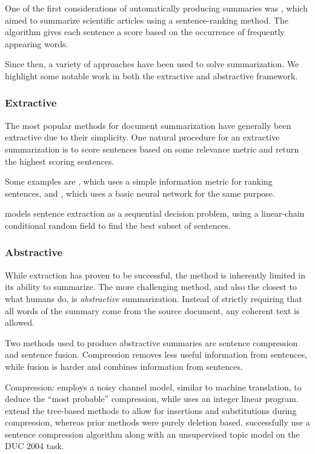 \documentclass[11pt]{report}
\begin{document}
One of the first considerations of automatically producing summaries was \cite{luhn1958automatic}, which aimed to summarize scientific articles using a sentence-ranking method. The algorithm gives each sentence a score based on the occurrence of frequently appearing words.


Since then, a variety of approaches have been used to solve summarization. We highlight some notable work in both the extractive and abstractive framework.

\subsubsection{Extractive}

The most popular methods for document summarization have generally been extractive due to their simplicity. One natural procedure for an extractive summarization is to score sentences based on some relevance metric and return the highest scoring sentences.

Some examples are \cite{carbonell1998MMR}, which uses a simple information metric for ranking sentences, and \cite{svore2007}, which uses a basic neural network for the same purpose.

\citet{Shen2004} models sentence extraction as a sequential decision problem, using a linear-chain conditional random field to find the best subset of sentences.



\subsubsection{Abstractive}

While extraction has proven to be successful, the method is inherently limited in its ability to summarize. The more challenging method, and also the closest to what humans do, is \emph{abstractive} summarization. Instead of strictly requiring that all words of the summary come from the source document, any coherent text is allowed.

Two methods used to produce abstractive summaries are sentence compression and sentence fusion. Compression removes less useful information from sentences, while fusion is harder and combines information from sentences. %

Compression: \citet{knight2002summarization} employs a noisy channel model, similar to machine translation, to deduce the ``most probable'' compression, while \citet{clarke2008global} uses an integer linear program. \citet{cohn2008sentence} extend the tree-based methods to allow for insertions and substitutions during compression, whereas prior methods were purely deletion based. \cite{zajic2004topiary} successfully use a sentence compression algorithm along with an unsupervised topic model on the DUC 2004 task.
\end{document}
